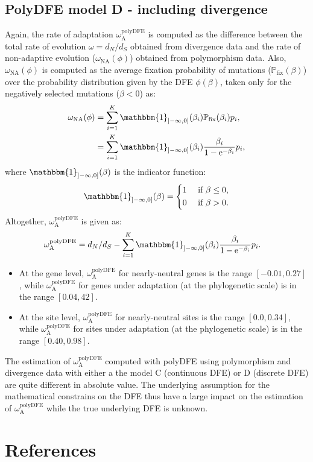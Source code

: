 \documentclass{article}
\newcommand{\e}{\mathrm{e}}
\newcommand{\dn}{d_N}
\newcommand{\ds}{d_S}
\newcommand{\dnds}{\dn / \ds}
\newcommand{\rateApop}{\omega_{\mathrm{A}}}
\newcommand{\proba}{\mathbb{P}}
\newcommand{\pfix}{\proba_{\mathrm{fix}}}
\newcommand{\Spop}{\beta}
\begin{document}
    \subsection{PolyDFE model D - including divergence}
    Again, the rate of adaptation $\rateApop^{\mathrm{polyDFE}}$ is computed as the difference between the total rate of evolution $\omega=\dnds$ obtained from divergence data and the rate of non-adaptive evolution ($\omega_{\mathrm{NA}}(\phi)$) obtained from polymorphism data.
    Also, $\omega_{\mathrm{NA}}(\phi)$ is computed as the average fixation probability of mutations ($\pfix (\Spop)$) over the probability distribution given by the DFE $\phi (\Spop)$, taken only for the negatively selected mutations ($\Spop < 0$) as:
    \begin{align}
        \omega_{\mathrm{NA}}(\phi) &= \sum_{i=1}^{K} \mathbbm{1}_{]-\infty, 0]}(\Spop_i) \pfix (\Spop_i) p_i,  \\
        &= \sum_{i=1}^{K} \mathbbm{1}_{]-\infty, 0]}(\Spop_i) \frac{\Spop_i}{1 - \e^{-\Spop_i}} p_i,
    \end{align}
    where $\mathbbm{1}_{]-\infty, 0]}(\Spop)$ is the indicator function:
    \begin{equation}
        \mathbbm{1}_{]-\infty, 0]}(\Spop) =
        \begin{dcases}
            1 & \text{ if $\Spop \leq 0$,} \\
            0 & \text{ if $\Spop > 0$.} \\
        \end{dcases}
    \end{equation}
    Altogether, $\rateApop^{\mathrm{polyDFE}}$ is given as:
    \begin{align}
        \rateApop^{\mathrm{polyDFE}} &= \dnds - \sum_{i=1}^{K} \mathbbm{1}_{]-\infty, 0]}(\Spop_i) \frac{\Spop_i}{1 - \e^{-\Spop_i}} p_i.
    \end{align}
    \newpage
    

    \begin{itemize}
        \item At the gene level, $\rateApop^{\mathrm{polyDFE}}$ for nearly-neutral genes is the range $[-0.01,0.27]$, while $\rateApop^{\mathrm{polyDFE}}$ for genes under adaptation (at the phylogenetic scale) is in the range $[0.04,42]$.
        \item At the site level, $\rateApop^{\mathrm{polyDFE}}$ for nearly-neutral sites is the range $[0.0,0.34]$, while $\rateApop^{\mathrm{polyDFE}}$ for sites under adaptation (at the phylogenetic scale) is in the range $[0.40,0.98]$.
    \end{itemize}
    The estimation of $\rateApop^{\mathrm{polyDFE}}$ computed with polyDFE using polymorphism and divergence data with either a the model C (continuous DFE) or D (discrete DFE) are quite different in absolute value.
    The underlying assumption for the mathematical constrains on the DFE thus have a large impact on the estimation of $\rateApop^{\mathrm{polyDFE}}$ while the true underlying DFE is unknown.

    \pagebreak
    
    \section{References}
    \printbibliography[heading=none]
\end{document}
